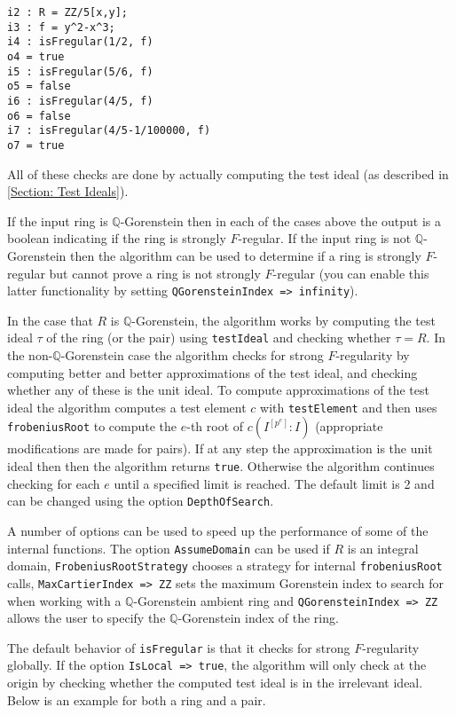 \documentclass[11pt]{amsart}
\begin{document}
\begin{verbatim}
i2 : R = ZZ/5[x,y];
i3 : f = y^2-x^3;
i4 : isFregular(1/2, f)
o4 = true
i5 : isFregular(5/6, f)
o5 = false
i6 : isFregular(4/5, f)
o6 = false
i7 : isFregular(4/5-1/100000, f)
o7 = true
\end{verbatim}

All of these checks are done by actually computing the test ideal (as described in \autoref{Section: Test Ideals}).

If the input ring is $\mathbb{Q}$-Gorenstein then in each of the cases above the output is a boolean indicating if the
ring is strongly $F$-regular. If the input ring is not
$\mathbb{Q}$-Gorenstein then the algorithm can be used to determine if a
ring is strongly $F$-regular but cannot prove a ring is not strongly
$F$-regular (you can enable this latter functionality by setting \texttt{QGorensteinIndex => infinity}).


In the case that $R$ is $\mathbb{Q}$-Gorenstein, the algorithm works by
computing the test ideal $\tau$ of the ring  (or the pair) using \texttt{testIdeal}
and checking whether $\tau=R$.
In the non-$\mathbb{Q}$-Gorenstein case the algorithm checks for
strong $F$-regularity by computing better and
better approximations of the test ideal, and checking whether any of these is the unit ideal.
To compute approximations of the
test ideal the algorithm computes a test element $c$ with \texttt{testElement}
and then uses \texttt{frobeniusRoot} to compute the $e$-th root of
$c(I^{[p^{e}]} : I)$ (appropriate modifications are made for pairs). If at
any step the approximation is the unit ideal then then the algorithm
returns \texttt{true}. Otherwise the algorithm continues checking for each $e$
until a specified limit is reached. The default limit is 2 and can be
changed using the option \texttt{DepthOfSearch}.


A number of options can be used to speed up the performance of some of the
internal functions. The option \texttt{AssumeDomain} can be used if $R$ is an
integral domain, \texttt{FrobeniusRootStrategy} chooses a strategy for
internal \texttt{frobeniusRoot} calls, \texttt{MaxCartierIndex => ZZ} sets the
maximum Gorenstein index to search for when working with a
$\mathbb{Q}$-Gorenstein ambient ring and \texttt{QGorensteinIndex => ZZ}
allows the user to specify the $\mathbb{Q}$-Gorenstein index of the ring.


The default behavior of \texttt{isFregular} is that it checks for strong $F$-regularity
globally. If the option \texttt{IsLocal => true}, the algorithm will only
check at the origin by checking whether the computed test ideal is in the irrelevant ideal.
Below is an example for both a ring and a pair.
\end{document}
